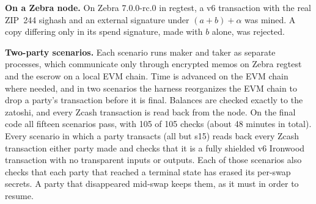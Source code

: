 \documentclass[10pt,letterpaper]{article}
\theoremstyle{plain}
\theoremstyle{definition}
\begin{document}
\textbf{On a Zebra node.} On Zebra 7.0.0-rc.0 in regtest, a v6 transaction with the real ZIP~244
sighash and an external signature under $(a+b)+\alpha$ was mined. A copy differing only in its
spend signature, made with $b$ alone, was rejected.

\textbf{Two-party scenarios.} Each scenario runs maker and taker as separate processes, which
communicate only through encrypted memos on Zebra regtest and the escrow on a local EVM chain.
Time is advanced on the EVM chain where needed, and in two scenarios the harness reorganizes the
EVM chain to drop a party's transaction before it is final. Balances are checked exactly to the zatoshi, and
every Zcash transaction is read back from the node. On the final code all fifteen scenarios pass, with 105 of 105 checks (about 48 minutes in total). Every scenario in which a party transacts (all but s15) reads back every Zcash transaction either party made and checks that it is a fully shielded v6 Ironwood transaction with no transparent inputs or outputs. Each of those scenarios also checks that each party that reached a terminal state has erased its per-swap secrets. A party that disappeared mid-swap keeps them, as it must in order to resume.
\end{document}
